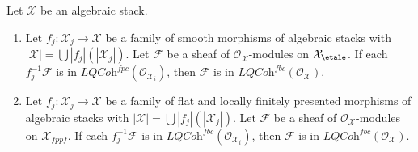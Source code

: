 \begin{lemma}
\label{lemma-check-lqc-fbc-on-covering}
Let $\mathcal{X}$ be an algebraic stack.
\begin{enumerate}
\item Let $f_j : \mathcal{X}_j \to \mathcal{X}$ be a family of smooth
morphisms of algebraic stacks with
$|\mathcal{X}| =\bigcup |f_j|(|\mathcal{X}_j|)$.
Let $\mathcal{F}$ be a sheaf of $\mathcal{O}_\mathcal{X}$-modules
on $\mathcal{X}_\etale$. If each $f_j^{-1}\mathcal{F}$
is in $\textit{LQCoh}^{fpc}(\mathcal{O}_{\mathcal{X}_i})$, then
$\mathcal{F}$ is in
$\textit{LQCoh}^{fbc}(\mathcal{O}_\mathcal{X})$.
\item  Let $f_j : \mathcal{X}_j \to \mathcal{X}$ be a family of flat
and locally finitely presented morphisms of algebraic stacks with
$|\mathcal{X}| =\bigcup |f_j|(|\mathcal{X}_j|)$.
Let $\mathcal{F}$ be a sheaf of $\mathcal{O}_\mathcal{X}$-modules
on $\mathcal{X}_{fppf}$. If each $f_j^{-1}\mathcal{F}$
is in $\textit{LQCoh}^{fbc}(\mathcal{O}_{\mathcal{X}_i})$, then
$\mathcal{F}$ is in $\textit{LQCoh}^{fbc}(\mathcal{O}_\mathcal{X})$.
\end{enumerate}
\end{lemma}

